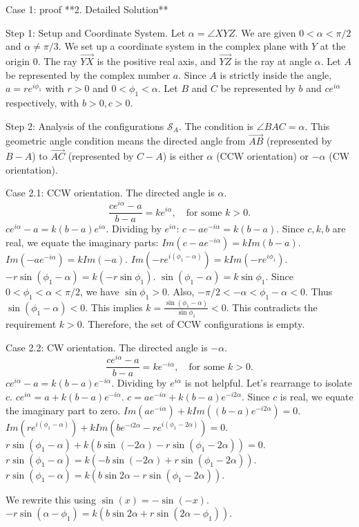 \documentclass{article} %
\begin{document}
\begin{promptbox}{Case 1: proof}
**2. Detailed Solution**

Step 1: Setup and Coordinate System.
Let $\alpha = \angle XYZ$. We are given $0 < \alpha < \pi/2$ and $\alpha \ne \pi/3$.
We set up a coordinate system in the complex plane with $Y$ at the origin $0$. The ray $\overrightarrow{YX}$ is the positive real axis, and $\overrightarrow{YZ}$ is the ray at angle $\alpha$.
Let $A$ be represented by the complex number $a$. Since $A$ is strictly inside the angle, $a=re^{i\phi_1}$ with $r>0$ and $0<\phi_1<\alpha$.
Let $B$ and $C$ be represented by $b$ and $ce^{i\alpha}$ respectively, with $b>0, c>0$.

Step 2: Analysis of the configurations $\mathcal{S}_A$.
The condition is $\angle BAC = \alpha$. This geometric angle condition means the directed angle from $\vec{AB}$ (represented by $B-A$) to $\vec{AC}$ (represented by $C-A$) is either $\alpha$ (CCW orientation) or $-\alpha$ (CW orientation).

Case 2.1: CCW orientation.
The directed angle is $\alpha$.
\[ \frac{ce^{i\alpha}-a}{b-a} = k e^{i\alpha}, \quad \text{for some } k>0. \]
$ce^{i\alpha}-a = k(b-a)e^{i\alpha}$. Dividing by $e^{i\alpha}$:
$c - ae^{-i\alpha} = k(b-a)$.
Since $c, k, b$ are real, we equate the imaginary parts:
$Im(c - ae^{-i\alpha}) = k Im(b-a)$.
$Im(-ae^{-i\alpha}) = k Im(-a)$.
$Im(-re^{i(\phi_1-\alpha)}) = k Im(-re^{i\phi_1})$.
$-r\sin(\phi_1-\alpha) = k (-r\sin\phi_1)$.
$\sin(\phi_1-\alpha) = k\sin\phi_1$.
Since $0<\phi_1<\alpha<\pi/2$, we have $\sin\phi_1>0$.
Also, $-\pi/2 < -\alpha < \phi_1-\alpha < 0$. Thus $\sin(\phi_1-\alpha)<0$.
This implies $k = \frac{\sin(\phi_1-\alpha)}{\sin\phi_1} < 0$.
This contradicts the requirement $k>0$.
Therefore, the set of CCW configurations is empty.

Case 2.2: CW orientation.
The directed angle is $-\alpha$.
\[ \frac{ce^{i\alpha}-a}{b-a} = k e^{-i\alpha}, \quad \text{for some } k>0. \]
$ce^{i\alpha}-a = k(b-a)e^{-i\alpha}$.
Dividing by $e^{i\alpha}$ is not helpful. Let's rearrange to isolate $c$.
$c e^{i\alpha} = a + k(b-a)e^{-i\alpha}$.
$c = ae^{-i\alpha} + k(b-a)e^{-i2\alpha}$.
Since $c$ is real, we equate the imaginary part to zero.
$Im(ae^{-i\alpha}) + k Im((b-a)e^{-i2\alpha}) = 0$.
$Im(re^{i(\phi_1-\alpha)}) + k Im(be^{-i2\alpha} - re^{i(\phi_1-2\alpha)}) = 0$.
$r\sin(\phi_1-\alpha) + k (b\sin(-2\alpha) - r\sin(\phi_1-2\alpha)) = 0$.
$r\sin(\phi_1-\alpha) = k (-b\sin(-2\alpha) + r\sin(\phi_1-2\alpha))$.
$r\sin(\phi_1-\alpha) = k (b\sin 2\alpha - r\sin(\phi_1-2\alpha))$.

We rewrite this using $\sin(x)=-\sin(-x)$.
$-r\sin(\alpha-\phi_1) = k (b\sin 2\alpha + r\sin(2\alpha-\phi_1))$.


\end{promptbox}
\end{document}
